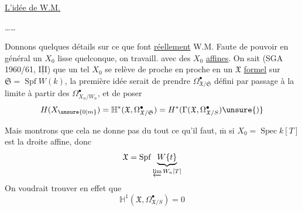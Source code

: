 
\uline{L'idée de W.M.}

\ldots\ldots

Donnons quelques détails sur ce que font \uline{réellement} W.M. Faute de pouvoir  en général un $X_0$ lisse quelconque, on travaill.  avec des $X_0$ \uline{affines}. On sait (SGA 1960/61, $\overline{\underline{\mathrm{III}}}$) que un tel $X_0$ se relève de proche en proche en un $\mathfrak X$ \uline{formel}  sur $\mathfrak S=\operatorname{Spf}W(k)$,  la première idée serait de prendre $\Omega^\bullet_{\mathfrak X/\mathfrak S}$ défini par passage à la limite à partir des $\Omega^\bullet_{X_n/W_n}$, et de poser
\[
H(X_{\unsure{0|m}})=\mathbb H^*(\mathfrak X,\Omega^\bullet_{\mathfrak X/\mathfrak S})
=H^*(\Gamma(\mathfrak X,\Omega^\bullet_{\mathfrak X/S})\unsure{)}
\]

Mais montrons que cela ne donne pas du tout ce qu'il faut, $\overline{\mathrm m}$ si $X_0=\operatorname{Spec} k[T]$ est la droite affine, donc
\[
\mathfrak X=\operatorname{Spf}
\underbrace{W\{t\}}_{\varprojlim W_n[T]}
\]
On voudrait trouver en effet que
\[
\mathbb H^1(\mathfrak X,\Omega^\bullet_{\mathfrak X/S})=0
\]

